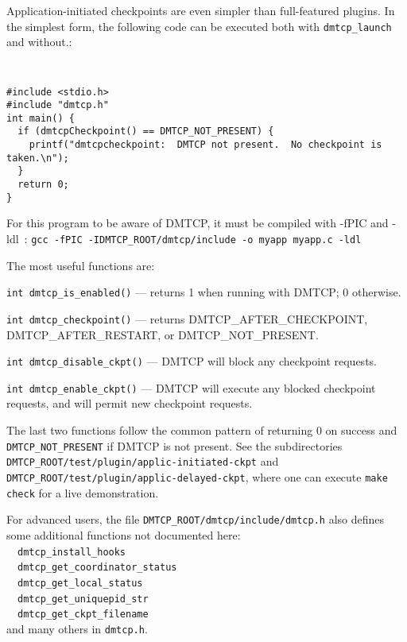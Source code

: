 \documentclass{article}
\begin{document}
Application-initiated checkpoints are even simpler than full-featured
plugins.  In the simplest form, the following code can be executed both
with {\tt dmtcp\_launch} and without.:

{\tt
\begin{verbatim}
#include <stdio.h>
#include "dmtcp.h"
int main() {
  if (dmtcpCheckpoint() == DMTCP_NOT_PRESENT) {
    printf("dmtcpcheckpoint:  DMTCP not present.  No checkpoint is taken.\n");
  }
  return 0;
}
\end{verbatim}
}

For this program to be aware of DMTCP, it must be compiled with -fPIC and -ldl~:
\hfill\break
\medskip\noindent
  \hspace{0.3truein} {\tt gcc -fPIC -IDMTCP\_ROOT/dmtcp/include -o myapp
                      myapp.c -ldl}
\medskip

The most useful functions are:
\begin{list}{}{\leftmargin=3em \itemindent=-2em}
\item
  {\tt int dmtcp\_is\_enabled()} --- returns 1 when running with DMTCP;
                                     0 otherwise.
\item
  {\tt int dmtcp\_checkpoint()} --- returns DMTCP\_AFTER\_CHECKPOINT,
                                 DMTCP\_AFTER\_RESTART, or DMTCP\_NOT\_PRESENT.
\item
  {\tt int dmtcp\_disable\_ckpt()} --- DMTCP will block any
				 checkpoint requests.
\item
  {\tt int dmtcp\_enable\_ckpt()} --- DMTCP will execute any blocked
                checkpoint requests, and will permit new checkpoint requests.
\end{list}

The last two functions follow the common pattern of returning 0 on success
and {\tt DMTCP\_NOT\_PRESENT} if DMTCP is not present.
See the subdirectories
{\tt DMTCP\_ROOT/test/plugin/applic-initiated-ckpt}
and
{\tt DMTCP\_ROOT/test/plugin/applic-delayed-ckpt}, where one can execute
{\tt make check} for a live demonstration.

For advanced users, the file {\tt DMTCP\_ROOT/dmtcp/include/dmtcp.h}
also defines some additional functions not documented here:\\
~~{\tt dmtcp\_install\_hooks}\\
~~{\tt dmtcp\_get\_coordinator\_status}\\
~~{\tt dmtcp\_get\_local\_status}\\
~~{\tt dmtcp\_get\_uniquepid\_str}\\
~~{\tt dmtcp\_get\_ckpt\_filename}\\
and many others in {\tt dmtcp.h}.
\end{document}
